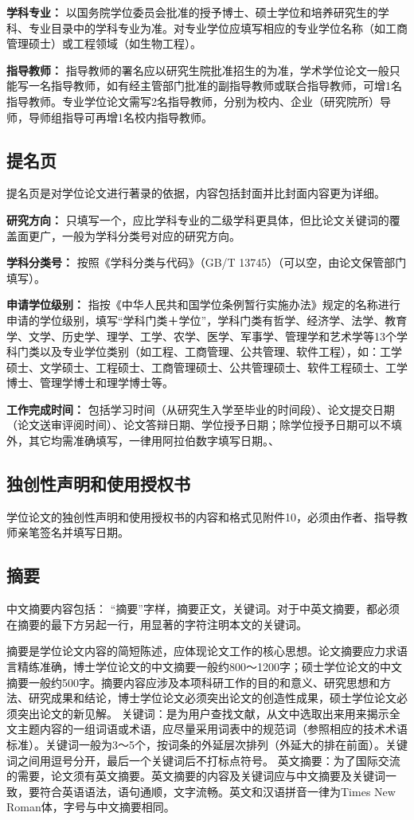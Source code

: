 {\bfseries 学科专业：} 以国务院学位委员会批准的授予博士、硕士学位和培养研究生的学科、专业目录中的学科专业为准。对专业学位应填写相应的专业学位名称（如工商管理硕士）或工程领域（如生物工程）。

{\bfseries 指导教师：} 指导教师的署名应以研究生院批准招生的为准，学术学位论文一般只能写一名指导教师，如有经主管部门批准的副指导教师或联合指导教师，可增1名指导教师。专业学位论文需写2名指导教师，分别为校内、企业（研究院所）导师，导师组指导可再增1名校内指导教师。

\subsection{提名页}
提名页是对学位论文进行著录的依据，内容包括封面并比封面内容更为详细。

{\bfseries 研究方向：} 只填写一个，应比学科专业的二级学科更具体，但比论文关键词的覆盖面更广，一般为学科分类号对应的研究方向。

{\bfseries 学科分类号：} 按照《学科分类与代码》（GB/T 13745）（可以空，由论文保管部门填写）。

{\bfseries 申请学位级别：} 指按《中华人民共和国学位条例暂行实施办法》规定的名称进行申请的学位级别，填写“学科门类＋学位”，学科门类有哲学、经济学、法学、教育学、文学、历史学、理学、工学、农学、医学、军事学、管理学和艺术学等13个学科门类以及专业学位类别（如工程、工商管理、公共管理、软件工程），如：工学硕士、文学硕士、工程硕士、工商管理硕士、公共管理硕士、软件工程硕士、工学博士、管理学博士和理学博士等。

{\bfseries 工作完成时间：} 包括学习时间（从研究生入学至毕业的时间段）、论文提交日期（论文送审评阅时间）、论文答辩日期、学位授予日期；除学位授予日期可以不填外，其它均需准确填写，一律用阿拉伯数字填写日期。、

\subsection{独创性声明和使用授权书}
学位论文的独创性声明和使用授权书的内容和格式见附件10，必须由作者、指导教师亲笔签名并填写日期。

\subsection{摘要}
中文摘要内容包括： “摘要”字样，摘要正文，关键词。对于中英文摘要，都必须在摘要的最下方另起一行，用显著的字符注明本文的关键词。

摘要是学位论文内容的简短陈述，应体现论文工作的核心思想。论文摘要应力求语言精练准确，博士学位论文的中文摘要一般约800～1200字；硕士学位论文的中文摘要一般约500字。摘要内容应涉及本项科研工作的目的和意义、研究思想和方法、研究成果和结论，博士学位论文必须突出论文的创造性成果，硕士学位论文必须突出论文的新见解。
关键词：是为用户查找文献，从文中选取出来用来揭示全文主题内容的一组词语或术语，应尽量采用词表中的规范词（参照相应的技术术语标准）。关键词一般为3～5个，按词条的外延层次排列（外延大的排在前面）。关键词之间用逗号分开，最后一个关键词后不打标点符号。
英文摘要：为了国际交流的需要，论文须有英文摘要。英文摘要的内容及关键词应与中文摘要及关键词一致，要符合英语语法，语句通顺，文字流畅。英文和汉语拼音一律为Times New Roman体，字号与中文摘要相同。

